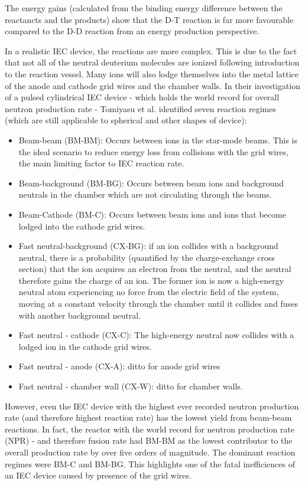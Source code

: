 \documentclass[a4paper,titlepage]{article}
\let\cite\parencite
\begin{document}
\begin{flushleft}
The energy gains (calculated from the binding energy difference between the reactancts and the products) show that the D-T reaction is far more favourable compared to the D-D reaction from an energy production perspective. 

In a realistic IEC device, the reactions are more complex. This is due to the fact that not all of the neutral deuterium molecules are ionized following introduction to the reaction vessel. Many ions will also lodge themselves into the metal lattice of the anode and cathode grid wires and the chamber walls. In their investigation of a pulsed cylindrical IEC device - which holds the world record for overall neutron production rate - Tomiyasu et al. identified seven reaction regimes (which are still applicable to spherical and other shapes of device):

\begin{itemize}
    \item Beam-beam (BM-BM): Occurs between ions in the star-mode beams. This is the ideal scenario to reduce energy loss from collisions with the grid wires, the main limiting factor to IEC reaction rate. 
    \item Beam-background (BM-BG): Occurs between beam ions and background neutrals in the chamber which are not circulating through the beams. 
    \item Beam-Cathode (BM-C): Occurs between beam ions and ions that become lodged into the cathode grid wires.
    \item Fast neutral-background (CX-BG): if an ion collides with a background neutral, there is a probability (quantified by the charge-exchange cross section) that the ion acquires an electron from the neutral, and the neutral therefore gains the charge of an ion. The former ion is now a high-energy neutral atom experiencing no force from the electric field of the system, moving at a constant velocity through the chamber until it collides and fuses with another background neutral.
    \item Fast neutral - cathode (CX-C): The high-energy neutral now collides with a lodged ion in the cathode grid wires.
    \item Fast neutral - anode (CX-A): ditto for anode grid wires
    \item Fast neutral - chamber wall (CX-W): ditto for chamber walls. 
\end{itemize}


However, even the IEC device with the highest ever recorded neutron production rate (and therefore highest reaction rate) has the lowest yield from beam-beam reactions. In fact, the reactor with the world record for neutron production rate (NPR) - and therefore fusion rate \cite{tomiyasu_2009_effects} had BM-BM as the lowest contributor to the overall production rate by over five orders of magnitude. The dominant reaction regimes were BM-C and BM-BG. This highlights  one of the fatal inefficiences of an IEC device caused by presence of the grid wires. 


\end{flushleft}
\end{document}
